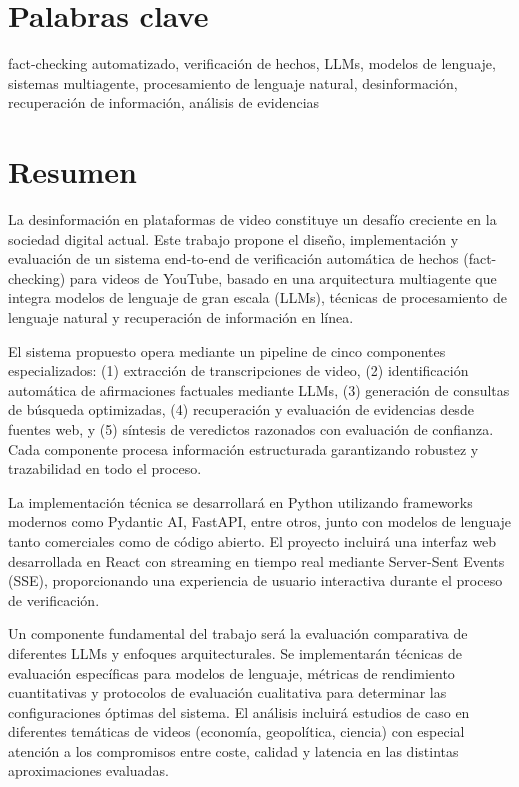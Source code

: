 \documentclass[12pt,a4paper]{article}
\begin{document}
\section{Palabras clave}

fact-checking automatizado, verificación de hechos, LLMs, modelos de lenguaje, sistemas multiagente, procesamiento de lenguaje natural, desinformación, recuperación de información, análisis de evidencias

\section{Resumen}

La desinformación en plataformas de video constituye un desafío creciente en la sociedad digital actual. Este trabajo propone el diseño, implementación y evaluación de un sistema end-to-end de verificación automática de hechos (fact-checking) para videos de YouTube, basado en una arquitectura multiagente que integra modelos de lenguaje de gran escala (LLMs), técnicas de procesamiento de lenguaje natural y recuperación de información en línea.

El sistema propuesto opera mediante un pipeline de cinco componentes especializados: (1) extracción de transcripciones de video, (2) identificación automática de afirmaciones factuales mediante LLMs, (3) generación de consultas de búsqueda optimizadas, (4) recuperación y evaluación de evidencias desde fuentes web, y (5) síntesis de veredictos razonados con evaluación de confianza. Cada componente procesa información estructurada garantizando robustez y trazabilidad en todo el proceso.

La implementación técnica se desarrollará en Python utilizando frameworks modernos como Pydantic AI, FastAPI, entre otros, junto con modelos de lenguaje tanto comerciales como de código abierto. El proyecto incluirá una interfaz web desarrollada en React con streaming en tiempo real mediante Server-Sent Events (SSE), proporcionando una experiencia de usuario interactiva durante el proceso de verificación.

Un componente fundamental del trabajo será la evaluación comparativa de diferentes LLMs y enfoques arquitecturales. Se implementarán técnicas de evaluación específicas para modelos de lenguaje, métricas de rendimiento cuantitativas y protocolos de evaluación cualitativa para determinar las configuraciones óptimas del sistema. El análisis incluirá estudios de caso en diferentes temáticas de videos (economía, geopolítica, ciencia) con especial atención a los compromisos entre coste, calidad y latencia en las distintas aproximaciones evaluadas.
\end{document}

